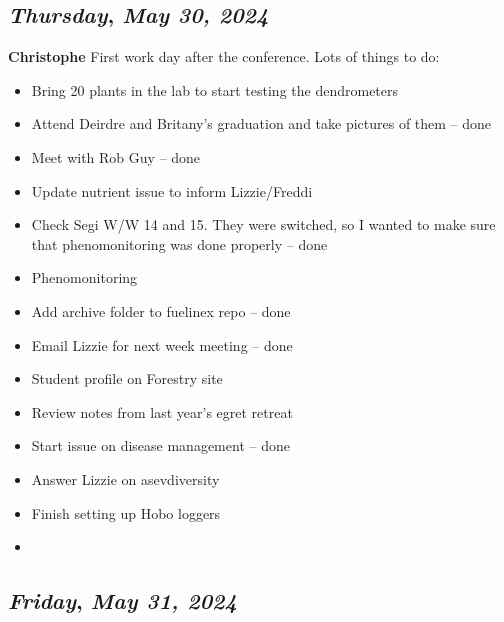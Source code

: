 \def\day{\textit{May 30, 2024}}
\def\weekday{\textit{Thursday}}
\subsection*{\weekday, \day}
\textbf{Christophe}
First work day after the conference. Lots of things to do:
\begin{itemize}
    \item Bring 20 plants in the lab to start testing the dendrometers
    \item Attend Deirdre and Britany's graduation and take pictures of them -- done
    \item Meet with Rob Guy -- done
    \item Update nutrient issue to inform Lizzie/Freddi
    \item Check Segi W/W 14 and 15. They were switched, so I wanted to make sure that phenomonitoring was done properly -- done
    \item Phenomonitoring
    \item Add archive folder to fuelinex repo  -- done
    \item Email Lizzie for next week meeting -- done
    \item Student profile on Forestry site
    \item Review notes from last year's egret retreat
    \item Start issue on disease management -- done
    \item Answer Lizzie on asevdiversity
    \item Finish setting up Hobo loggers 
    \item 
\end{itemize}

\def\day{\textit{May 31, 2024}}
\def\weekday{\textit{Friday}}
\subsection*{\weekday, \day}